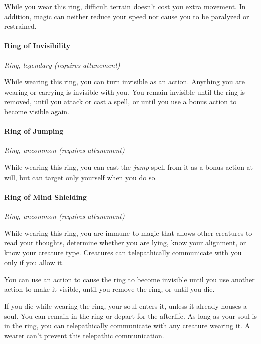 \documentclass[
]{article}
\begin{document}
While you wear this ring, difficult terrain doesn't cost you extra
movement. In addition, magic can neither reduce your speed nor cause you
to be paralyzed or restrained.

\hypertarget{ring-of-invisibility}{%
\paragraph{Ring of Invisibility}\label{ring-of-invisibility}}

\emph{Ring, legendary (requires attunement)}

While wearing this ring, you can turn invisible as an action. Anything
you are wearing or carrying is invisible with you. You remain invisible
until the ring is removed, until you attack or cast a spell, or until
you use a bonus action to become visible again.

\hypertarget{ring-of-jumping}{%
\paragraph{Ring of Jumping}\label{ring-of-jumping}}

\emph{Ring, uncommon (requires attunement)}

While wearing this ring, you can cast the \emph{jump} spell from it as a
bonus action at will, but can target only yourself when you do so.

\hypertarget{ring-of-mind-shielding}{%
\paragraph{Ring of Mind Shielding}\label{ring-of-mind-shielding}}

\emph{Ring, uncommon (requires attunement)}

While wearing this ring, you are immune to magic that allows other
creatures to read your thoughts, determine whether you are lying, know
your alignment, or know your creature type. Creatures can telepathically
communicate with you only if you allow it.

You can use an action to cause the ring to become invisible until you
use another action to make it visible, until you remove the ring, or
until you die.

If you die while wearing the ring, your soul enters it, unless it
already houses a soul. You can remain in the ring or depart for the
afterlife. As long as your soul is in the ring, you can telepathically
communicate with any creature wearing it. A wearer can't prevent this
telepathic communication.
\end{document}
